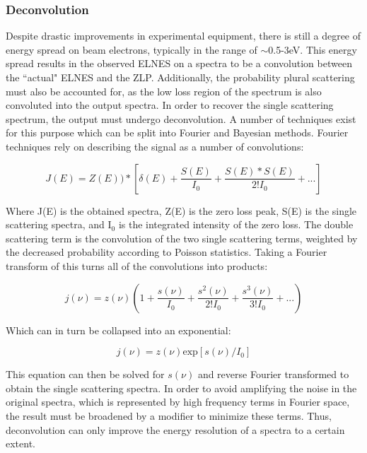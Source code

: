 \subsubsection{Deconvolution} \label{deconvolution}
Despite drastic improvements in experimental equipment, there is still a degree of energy spread on beam electrons, typically in the range of $\sim$0.5-3eV.  This energy spread results in the observed ELNES on a spectra to be a convolution between the ``actual" ELNES and the ZLP.  Additionally, the probability plural scattering must also be accounted for, as the low loss region of the spectrum is also convoluted into the output spectra.  In order to recover the single scattering spectrum, the output must undergo deconvolution.  A number of techniques exist for this purpose which can be split into Fourier and Bayesian methods.   Fourier techniques rely on describing the signal as a number of convolutions:

\begin{equation}
 	J(E) = Z(E))\ast[\delta(E) + \frac{S(E)}{I_0} +  \frac{S(E) \ast S(E)}{2! I_0}   + ...]
\end{equation}



Where J(E) is the obtained spectra, Z(E) is the zero loss peak, S(E) is the single scattering spectra, and I$_0$ is the integrated intensity of the zero loss.  The double scattering term is the convolution of the two single scattering terms, weighted by the decreased probability according to Poisson statistics.   Taking a Fourier transform of this turns all of the convolutions into products: 

\begin{equation}
	j(\nu) = z(\nu) \left(1+\frac{s(\nu)}{I_0}+   \frac{s^2(\nu)}{2! I_0}+ \frac{s^3(\nu)}{3! I_0} + ...\right)
	\label{fourier_spectra}
\end{equation} 

Which can in turn be collapsed into an exponential:

\begin{equation}
	j(\nu) = z(\nu)\mathrm{exp}[s(\nu)/I_0]
\end{equation}

This equation can then be solved for $s(\nu)$ and reverse Fourier transformed to obtain the single scattering spectra.  In order to avoid amplifying the noise in the original spectra, which is represented by high frequency terms in Fourier space, the result must be broadened by a modifier to minimize these terms.  Thus, deconvolution can only improve the energy resolution of a spectra to a certain extent.  

